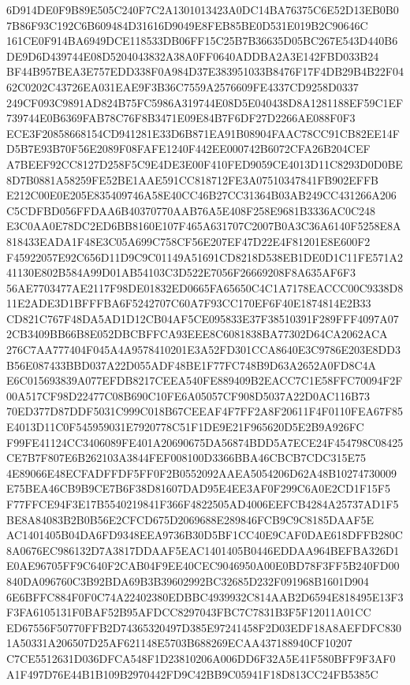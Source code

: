 \documentclass[UTF8,fontset=fandol,zihao=-4,a4paper]{ctexart}
\begin{document}
{{6D914DE0F9B89E505C240F7C2A1301013423A0DC14BA76375C6E52D13EB0B07B86F93C192C6B609484D31616D9049E8FEB85BE0D531E019B2C90646C
161CE0F914BA6949DCE118533DB06FF15C25B7B36635D05BC267E543D440B6DE9D6D439744E08D5204043832A38A0FF0640ADDBA2A3E142FBD033B24
BF44B957BEA3E757EDD338F0A984D37E383951033B8476F17F4DB29B4B22F0462C0202C43726EA031EAE9F3B36C7559A2576609FE4337CD9258D0337
249CF093C9891AD824B75FC5986A319744E08D5E040438D8A1281188EF59C1EF739744E0B6369FAB78C76F8B3471E09E84B7F6DF27D2266AE088F0F3
ECE3F20858668154CD941281E33D6B871EA91B08904FAAC78CC91CB82EE14FD5B7E93B70F56E2089F08FAFE1240F442EE000742B6072CFA26B204CEF
A7BEEF92CC8127D258F5C9E4DE3E00F410FED9059CE4013D11C8293D0D0BE8D7B0881A58259FE52BE1AAE591CC818712FE3A07510347841FB902EFFB
E212C00E0E205E835409746A58E40CC46B27CC31364B03AB249CC431266A206C5CDFBD056FFDAA6B40370770AAB76A5E408F258E9681B3336AC0C248
E3C0AA0E78DC2ED6BB8160E107F465A631707C2007B0A3C36A6140F5258E8A818433EADA1F48E3C05A699C758CF56E207EF47D22E4F81201E8E600F2
F45922057E92C656D11D9C9C01149A51691CD8218D538EB1DE0D1C11FE571A241130E802B584A99D01AB54103C3D522E7056F26669208F8A635AF6F3
56AE7703477AE2117F98DE01832ED0665FA65650C4C1A7178EACCC00C9338D811E2ADE3D1BFFFBA6F5242707C60A7F93CC170EF6F40E1874814E2B33
CD821C767F48DA5AD1D12CB04AF5CE095833E37F38510391F289FFF4097A072CB3409BB66B8E052DBCBFFCA93EEE8C6081838BA77302D64CA2062ACA
276C7AA777404F045A4A9578410201E3A52FD301CCA8640E3C9786E203E8DD3B56E087433BBD037A22D055ADF48BE1F77FC748B9D63A2652A0FD8C4A
E6C015693839A077EFDB8217CEEA540FE889409B2EACC7C1E58FFC70094F2F00A517CF98D22477C08B690C10FE6A05057CF908D5037A22D0AC116B73
70ED377D87DDF5031C999C018B67CEEAF4F7FF2A8F20611F4F0110FEA67F85E4013D11C0F545959031E7920778C51F1DE9E21F965620D5E2B9A926FC
F99FE41124CC3406089FE401A20690675DA56874BDD5A7ECE24F454798C08425CE7B7F807E6B262103A3844FEF008100D3366BBA46CBCB7CDC315E75
4E89066E48ECFADFFDF5FF0F2B0552092AAEA5054206D62A48B10274730009E75BEA46CB9B9CE7B6F38D81607DAD95E4EE3AF0F299C6A0E2CD1F15F5
F77FFCE94F3E17B5540219841F366F4822505AD4006EEFCB4284A25737AD1F5BE8A84083B2B0B56E2CFCD675D2069688E289846FCB9C9C8185DAAF5E
AC1401405B04DA6FD9348EEA9736B30D5BF1CC40E9CAF0DAE618DFFB280C8A0676EC986132D7A3817DDAAF5EAC1401405B0446EDDAA964BEFBA326D1
E0AE96705FF9C640F2CAB04F9EE40CEC9046950A00E0BD78F3FF5B240FD00840DA096760C3B92BDA69B3B39602992BC32685D232F091968B1601D904
6E6BFFC884F0F0C74A22402380EDBBC4939932C814AAB2D6594E818495E13F3F3FA6105131F0BAF52B95AFDCC8297043FBC7C7831B3F5F12011A01CC
ED67556F50770FFB2D74365320497D385E97241458F2D03EDF18A8AEFDFC8301A50331A206507D25AF621148E5703B688269ECAA437188940CF10207
C7CE5512631D036DFCA548F1D23810206A006DD6F32A5E41F580BFF9F3AF0A1F497D76E44B1B109B2970442FD9C42BB9C05941F18D813CC24FB5385C
}}
\end{document}

